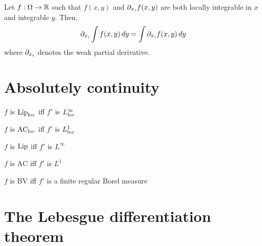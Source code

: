 \documentclass{../note}
\begin{document}
\begin{prb}
Let $f:\Omega\to\mathbb{R}$
such that $f(x,y)$ and $\pd_{x_i}f(x,y)$ are both locally integrable in $x$ and integrable $y$.
Then,
\[\pd_{x_i}\int f(x,y)\,dy=\int\pd_{x_i}f(x,y)\,dy\]
where $\pd_{x_i}$ denotes the weak partial derivative.
\end{prb}





\chapter{Absolutely continuity}

\begin{parts}
\item $f$ is $\operatorname{Lip}_{\mathrm{loc}}$ iff $f'$ is $L_{\mathrm{loc}}^\infty$
\item $f$ is $\textrm{AC}_{\mathrm{loc}}$ iff $f'$ is $L_{\mathrm{loc}}^1$
\end{parts}
\begin{parts}
\item $f$ is $\operatorname{Lip}$ iff $f'$ is $L^\infty$
\item $f$ is $\textrm{AC}$ iff $f'$ is $L^1$
\item $f$ is $\textrm{BV}$ iff $f'$ is a finite regular Borel measure
\end{parts}



\chapter{The Lebesgue differentiation theorem}
\end{document}
